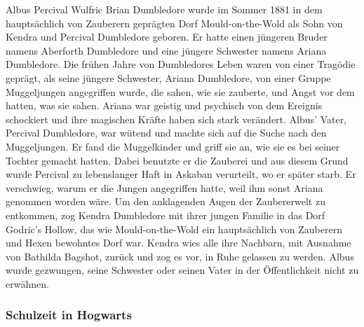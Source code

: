 \documentclass[a4paper, 10pt]{article}
\begin{document}
Albus Percival Wulfric Brian Dumbledore wurde im Sommer 1881 in dem hauptsächlich von Zauberern geprägten Dorf Mould-on-the-Wold als Sohn von Kendra und Percival Dumbledore geboren. Er hatte einen jüngeren Bruder namens Aberforth Dumbledore und eine jüngere Schwester namens Ariana Dumbledore. Die frühen Jahre von Dumbledores Leben waren von einer Tragödie geprägt, als seine jüngere Schwester, Ariana Dumbledore, von einer Gruppe Muggeljungen angegriffen wurde, die sahen, wie sie zauberte, und Angst vor dem hatten, was sie sahen.
\vspace{10pt}
\newline
{}  
Ariana war geistig und psychisch von dem Ereignis schockiert und ihre magischen Kräfte haben sich stark verändert. Albus' Vater, Percival Dumbledore, war wütend und machte sich auf die Suche nach den Muggeljungen. Er fand die Muggelkinder und griff sie an, wie sie es bei seiner Tochter gemacht hatten. Dabei benutzte er die Zauberei und aus diesem Grund wurde Percival zu lebenslanger Haft in Askaban verurteilt, wo er später starb. Er verschwieg, warum er die Jungen angegriffen hatte, weil ihm sonst Ariana genommen worden wäre.
\vspace{10pt}
\newline
{}  
Um den anklagenden Augen der Zaubererwelt zu entkommen, zog Kendra Dumbledore mit ihrer jungen Familie in das Dorf Godric's Hollow, das wie Mould-on-the-Wold ein hauptsächlich von Zauberern und Hexen bewohntes Dorf war. Kendra wies alle
ihre Nachbarn, mit Ausnahme von Bathilda Bagshot, zurück und zog es vor, in Ruhe gelassen zu werden. Albus wurde gezwungen, seine Schwester oder seinen Vater in der Öffentlichkeit nicht zu erwähnen.

\subsubsection*{\large Schulzeit in Hogwarts}
\end{document}
